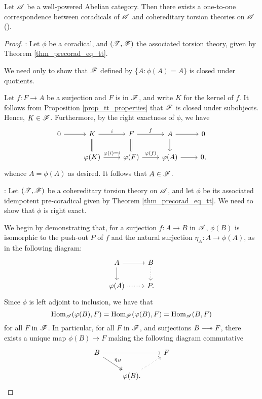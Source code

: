 \begin{thm}\label{thm_corad_equiv_htt}
Let $\mathscr{A}$ be a well-powered Abelian category. Then there 
exists a one-to-one correspondence between coradicals of $\mathscr{A}$ 
and cohereditary torsion theories on $\mathscr{A}$ (\CF \cite[I2.12]{BJV}).
\end{thm}
\begin{proof}

 : Let 
$\phi$ be a coradical, and $(\mathscr{T}, \mathscr{F})$ the associated
torsion theory, given by Theorem \ref{thm_precorad_eq_tt}.

We need only to show that $\mathscr{F}$ defined by $\{A : \phi(A) = 
A\}$ is closed under quotients.

Let $f: F \to A$ be a surjection and $F$ is in $\mathscr{F}$,
and write $K$ for the kernel of $f$. It follows from Proposition
\ref{prop_tt_properties} that $\mathscr{F}$ is closed under 
subobjects. Hence, $K \in \mathscr{F}$. Furthermore, by the right 
exactness of $\phi$, we have
\[
\begin{tikzcd}
0 \arrow{r} & 
K \arrow{r}{i} \arrow[equals]{d} &
F \arrow{r}{f} \arrow[equals]{d} &
A \arrow{r} \arrow{d} &
0 \\
& \phi(K) \arrow{r}{\phi(i) = i} &
\phi(F) \arrow{r}{\phi(f)} &
\phi(A) \arrow{r} &
0,
\end{tikzcd}
\]
whence $A = \phi(A)$ as desired. It follows that $A \in \mathscr{F}$.

 : Let
$(\mathscr{T}, \mathscr{F})$ be a cohereditary torsion theory on $\mathscr{A}$,
and let $\phi$ be its associated idempotent pre-coradical given by 
Theorem \ref{thm_precorad_eq_tt}. We need to show that $\phi$ is right 
exact.

We begin by demonstrating that, for a surjection $f: A \to B$ in 
$\mathscr{A}$, $\phi(B)$ is isomorphic to the push-out $P$ of
$f$ and the natural surjection $\eta_A: A \to \phi(A)$, as in the
following diagram:
\[
\begin{tikzcd}
A \arrow{r} \arrow{d} & B \arrow[dotted]{d}\\
\phi(A) \arrow[dotted]{r} & P.
\end{tikzcd}
\]
Since $\phi$ is left adjoint to inclusion, we have that
\[
\mathrm{Hom}_{\mathscr{A}}(\varphi(B), F) = \mathrm{Hom}_{\mathscr{F}}(\varphi(B), F) = 
   \mathrm{Hom}_{\mathscr{A}}(B, F)
\]
for all $F$ in $\mathscr{F}$. In particular, for all $F$ in $\mathscr{F}$, 
and surjections $B \onto F$, there exists a unique map $\phi(B) 
\to F$ making the following diagram commutative
\[
\begin{tikzcd}
B \arrow[twoheadrightarrow]{rd}{\eta_B} \arrow{rr} & & F \\
&\phi(B) \arrow[dotted]{ru}.
\end{tikzcd}
\]


\end{proof}
